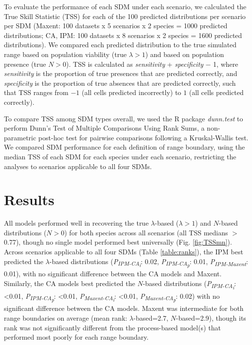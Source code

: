 \documentclass[preprint,review,times,12pt]{elsarticle}
\begin{document}
To evaluate the performance of each SDM under each scenario, we calculated the True Skill Statistic (TSS) \citep{Allouche2006} for each of the 100 predicted distributions per scenario per SDM (Maxent: 100 datasets x 5 scenarios x 2 species = 1000 predicted distributions; CA, IPM: 100 datasets x 8 scenarios x 2 species = 1600 predicted distributions). We compared each predicted distribution to the true simulated range based on population viability (true $\lambda > 1$) and based on population presence (true $N > 0$). TSS is calculated as \emph{sensitivity} + \emph{specificity} $-$ 1, where \emph{sensitivity} is the proportion of true presences that are predicted correctly, and \emph{specificity} is the proportion of true absences that are predicted correctly, such that TSS ranges from $-1$ (all cells predicted incorrectly) to $1$ (all cells predicted correctly).

To compare TSS among SDM types overall, we used the R package \emph{dunn.test} to perform Dunn's Test of Multiple Comparisons Using Rank Sums, a non-parametric post-hoc test for pairwise comparisons following a Kruskal-Wallis test. We compared SDM performance for each definition of range boundary, using the median TSS of each SDM for each species under each scenario, restricting the analyses to scenarios applicable to all four SDMs. 






\section{Results}
\label{S:3}

All models performed well in recovering the true $\lambda$-based ($\lambda > 1$) and $N$-based distributions ($N>0$) for both species across all scenarios (all TSS medians $>$ 0.77), though no single model performed best universally (Fig. \ref{fig:TSSmn}). Across scenarios applicable to all four SDMs (Table \ref{table:ranks}), the IPM best predicted the $\lambda$-based distributions (\emph{P\textsubscript{IPM-CA\textsubscript{i}}}: 0.02, \emph{P\textsubscript{IPM-CA\textsubscript{p}}}: 0.01, \emph{P\textsubscript{IPM-Maxent}}: 0.01), with no significant difference between the CA models and Maxent. Similarly, the CA models best predicted the $N$-based distributions (\emph{P\textsubscript{IPM-CA\textsubscript{i}}}: \textless0.01, \emph{P\textsubscript{IPM-CA\textsubscript{p}}}: \textless0.01, \emph{P\textsubscript{Maxent-CA\textsubscript{i}}}: \textless0.01, \emph{P\textsubscript{Maxent-CA\textsubscript{p}}}: 0.02) with no significant difference between the CA models. Maxent was intermediate for both range boundaries on average (mean rank: $\lambda$-based=2.7, $N$-based=2.9), though its rank was not significantly different from the process-based model(s) that performed most poorly for each range boundary.
\end{document}
